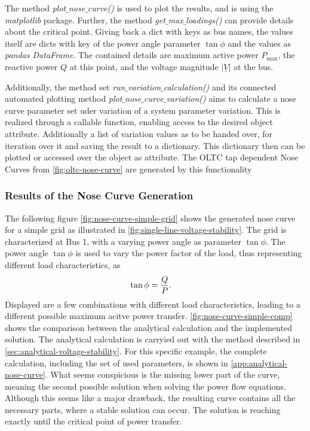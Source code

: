 The method {\itshape plot$\_$nose$\_$curve()} is used to plot the results, and is using the {\itshape matplotlib} package.
Further, the method {\itshape get$\_$max$\_$loadings()} can provide details about the critical point.
Giving back a dict with keys as bus names, the values itself are dicts with key of the power angle parameter $\tan \phi$ and the values as {\itshape pandas DataFrame}.
The contained details are maximum active power $P_\mathrm{max}$, the reactive power $Q$ at this point, and the voltage magnitude $\vert \underline{V} \vert$ at the bus.

Additionally, the method set \textit{run$\_$variation$\_$calculation()} and its connected automated plotting method \textit{plot$\_$nose$\_$curve$\_$variation()} aims to calculate a nose curve parameter set uder variation of a system parameter variation.
This is realized through a callable function, enabling access to the desired object attribute.
Additionally a list of variation values as to be handed over, for iteration over it and saving the result to a dictionary.
This dictionary then can be plotted or accessed over the object as attribute.
The \acs{OLTC} tap dependent Nose Curves from \autoref{fig:oltc-nose-curve} are generated by this functionality

\subsubsection{Results of the Nose Curve Generation}

The following figure \autoref{fig:nose-curve-simple-grid} shows the generated nose curve for a simple grid as illustrated in \autoref{fig:single-line-voltage-stability}.
The grid is characterized at Bus 1, with a varying power angle as parameter $\tan \phi$.
The power angle $\tan \phi$ is used to vary the power factor of the load, thus representing different load characteristics, as
\begin{align}
        \tan \phi &= \frac{Q}{P}. \notag %
\end{align}
Displayed are a few combinations with different load characteristics, leading to a different possible maximum acitve power transfer.
\autoref{fig:nose-curve-simple-comp} shows the comparison between the analytical calculation and the implemented solution.
The analytical calculation is carryied out with the method described in \autoref{sec:analytical-voltage-stability}.
For this specific example, the complete calculation, including the set of used parameters, is shown in \autoref{app:analytical-nose-curve}.
What seems conspicious is the missing lower part of the curve, meaning the second possible solution when solving the power flow equations.
Although this seems like a major drawback, the resulting curve contains all the necessary parts, where a stable solution can occur. \quelle
The solution is reaching exactly until the critical point of power transfer.

